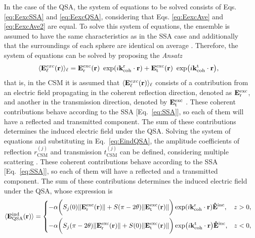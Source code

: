 In the case of the QSA, the system of equations to be solved consists of Eqs. \eqref{eq:EexcSSA} and \eqref{eq:EexcQSA}, considering that Eqs. \eqref{eq:EexcAve} and \eqref{eq:EexcAve2} are equal. To solve this system of equations, the ensemble is assumed to have the same characteristics as in the SSA case and additionally that the surroundings of each sphere are identical on average \cite{garcia2012multiple}. Therefore, the system of equations can be solved by proposing the \textit{Ansatz}
%
\begin{align}
	\langle\vb{E}^{exc}_\ell(\vb{r}) \rangle_\ell =
	\vb{E}^\text{exc}_\text{r}(\vb{r})\ \exp(i\vb{k}^\text{r}_\text{coh}\cdot\vb{r}) +
	\vb{E}^\text{exc}_\text{t}(\vb{r})\ \exp(i\vb{k}^\text{t}_\text{coh}\cdot\vb{r}),
\end{align}
%
that is, in the CSM it is assumed that $\langle\vb{E}^{exc}_\ell (\vb{r})\rangle_\ell$ consists of a contribution from an electric field propagating in the coherent reflection direction, denoted as $\vb{E}^\text{exc}_\text{r}$, and another in the transmission direction, denoted by $\vb{E}^\text{exc}_\text{t}$ \cite{garcia2012multiple}. These coherent contributions behave according to the SSA [Eq.~\eqref{eq:SSA}], so each of them will have a reflected and transmitted component. The sum of these contributions determines the induced electric field under the QSA. Solving the system of equations and substituting in Eq.~\eqref{eq:EindQSA}, the amplitude coefficients of reflection $r^{(j)}_\text{CSM}$ and transmission $t^{(j)}_\text{CSM}$ can be defined, considering multiple scattering \cite{garcia2012multiple,barrera_coherent_2003}. These coherent contributions behave according to the SSA [Eq.~\eqref{eq:SSA}], so each of them will have a reflected and a transmitted component. The sum of these contributions determines the induced electric field under the QSA, whose expression is
%
\begin{align}
	\langle \vb{E}_\text{QSA}^\text{ind}(\vb{r})\rangle =
	\begin{dcases}
		-\alpha \bigg( S_j(0) \norm{\vb{E}^\text{exc}_\text{r}(\vb{r})} +  S(\pi-2\theta)\norm{\vb{E}^\text{exc}_\text{t}(\vb{r})}\bigg)
		\exp(i\vb{k}^\text{r}_\text{coh}\cdot\vb{r}) \vu{E}^\text{inc}, & z > 0, \\
		-\alpha \bigg( S_j(\pi-2\theta) \norm{\vb{E}^\text{exc}_\text{r}(\vb{r})} + S(0)\norm{\vb{E}^\text{exc}_\text{t}(\vb{r})}\bigg)
		\exp(i\vb{k}^\text{t}_\text{coh}\cdot\vb{r}) \vu{E}^\text{inc},  & z < 0, \\
	\end{dcases}
	\label{eq:EindQSA}
\end{align}
